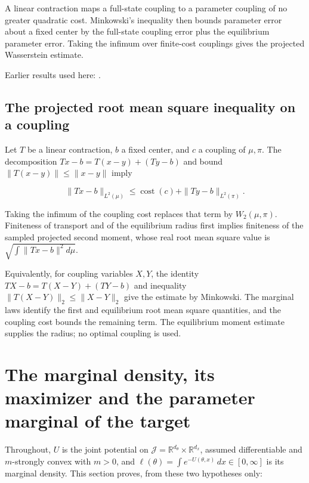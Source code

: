 \documentclass[11pt,a4paper]{report}
\begin{document}
A linear contraction maps a full-state coupling to a parameter coupling of no greater quadratic cost. Minkowski’s inequality then bounds parameter error about a fixed center by the full-state coupling error plus the equilibrium parameter error. Taking the infimum over finite-cost couplings gives the projected Wasserstein estimate.




Earlier results used here: \cite[Section~3.48]{LangevinLean2026ULASC}.
\subsection{\texorpdfstring{The projected root mean square inequality on a coupling}{The projected root mean square inequality on a coupling}}
\label{report-step-IPLA-Transport-lean-1}


Let \(T\) be a linear contraction, \(b\) a fixed center, and \(c\) a coupling of \(\mu,\pi\). The decomposition \(Tx-b=T(x-y)+(Ty-b)\) and bound \(\|T(x-y)\|\le\|x-y\|\) imply

\[\|Tx-b\|_{L^2(\mu)}\le\operatorname{cost}(c)+\|Ty-b\|_{L^2(\pi)}.\]

Taking the infimum of the coupling cost replaces that term by \(W_2(\mu,\pi)\). Finiteness of transport and of the equilibrium radius first implies finiteness of the sampled projected second moment, whose real root mean square value is \(\sqrt{\int\|Tx-b\|^2d\mu}\).



Equivalently, for coupling variables \(X,Y\), the identity \(TX-b=T(X-Y)+(TY-b)\) and inequality \(\|T(X-Y)\|_2\le\|X-Y\|_2\) give the estimate by Minkowski. The marginal laws identify the first and equilibrium root mean square quantities, and the coupling cost bounds the remaining term. The equilibrium moment estimate supplies the radius; no optimal coupling is used.


\section{\texorpdfstring{The marginal density, its maximizer and the parameter marginal of the target}{The marginal density, its maximizer and the parameter marginal of the target}}
\label{proof-module-IPLA-MarginalConcentration-lean}


Throughout, \(U\) is the joint potential on \(\mathcal J=\mathbb R^{d_\theta}\times\mathbb R^{d_x}\), assumed differentiable and \(m\)-strongly convex with \(m>0\), and \(\ell(\theta)=\int e^{-U(\theta,x)}\,dx\in[0,\infty]\) is its marginal density. This section proves, from these two hypotheses only:
\end{document}
